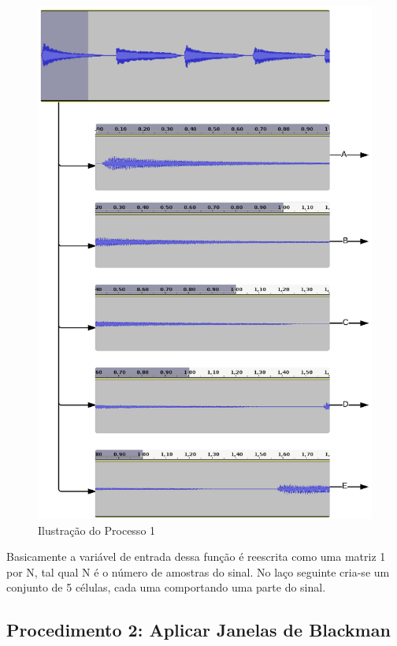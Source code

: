 \begin{figure}[h] 
  \centering
    \includegraphics[keepaspectratio=true, scale=0.7]{figuras/procedimento_1}
    \caption{Ilustração do Processo 1}
    \label{fig:procedimento_1}
\end{figure}


Basicamente a variável de entrada dessa função é reescrita como uma matriz 1 por N, tal qual N é o número de amostras do sinal. No laço seguinte cria-se um conjunto de 5 células, cada uma comportando uma parte do sinal.

\subsection{Procedimento 2: Aplicar Janelas de Blackman}
\label{subsec:procedimento_2}

